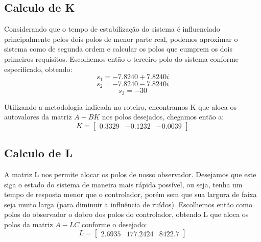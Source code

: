 \documentclass{article}
\begin{document}
\subsection{Calculo de K}
Considerando que o tempo de estabilização do sistema é influenciado principalmente pelos dois polos de menor parte real, podemos aproximar o sistema como de segunda ordem e calcular os polos que cumprem os dois primeiros requisitos. Escolhemos então o terceiro polo do sistema conforme especificado, obtendo:
\begin{equation}
	s_1=-7.8240 + 7.8240i
\end{equation}
\begin{equation}
	s_2=-7.8240 - 7.8240i
\end{equation}
\begin{equation}
	s_3=-30
\end{equation}

Utilizando a metodologia indicada no roteiro\cite{bb:roteiro}, encontramos K que aloca os autovalores da matriz $A - BK$ nos polos desejados, chegamos então a: 
\begin{equation}
\label{eq:matk}
K=
\begin{bmatrix}
0.3329 & -0.1232 & -0.0039
\end{bmatrix}
\end{equation}

\subsection{Calculo de L}
A matriz L nos permite alocar os polos de nosso observador. Desejamos que este siga o estado do sistema de maneira mais rápida possível, ou seja, tenha um tempo de resposta menor que o controlador, porém sem que sua largura de faixa seja muito larga (para diminuir a influência de ruídos). Escolhemos então como polos do observador o dobro dos polos do controlador, obtendo L que aloca os polos da matriz $A - LC$ conforme o desejado:
\begin{equation}
\label{eq:matl}
L=
\begin{bmatrix}
2.6935 & 177.2424 & 8422.7
\end{bmatrix}
\end{equation}
\end{document}
